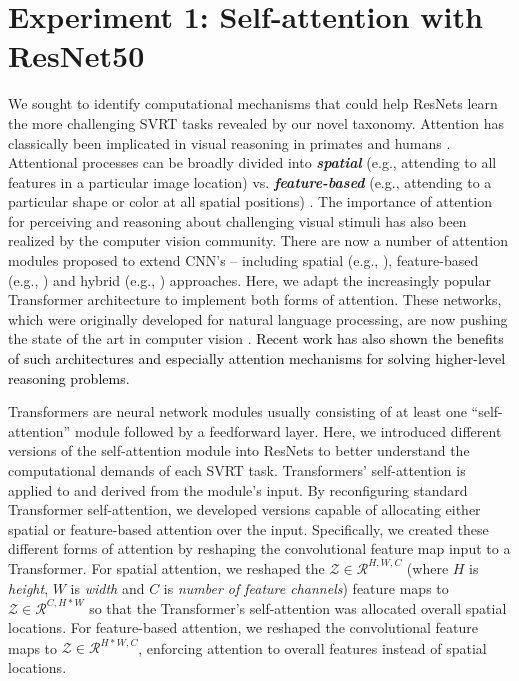 \section{Experiment 1: Self-attention with ResNet50}
\label{sec:exp2}
We sought to identify computational mechanisms that could help ResNets learn the more challenging SVRT tasks revealed by our novel taxonomy. Attention has classically been implicated in visual reasoning in primates and humans \citep{egly1994covert,roelfsema1998object}. Attentional processes can be broadly divided into \textit{\textbf{spatial}} (e.g., attending to all features in a particular image location) vs. \textit{\textbf{feature-based}} (e.g., attending to a particular shape or color at all spatial positions) \citep{desimone1995neural}. The importance of attention for perceiving and reasoning about challenging visual stimuli has also been realized by the computer vision community. There are now a number of attention modules proposed to extend CNN's -- including spatial  (e.g., \citet{Sharma2015-ow,journals/corr/ChenWCGXN15, yang2016, journals/corr/XuS15a,journals/corr/RenZ16}), feature-based (e.g., \citet{stollenga2014deep, chen2017sca, hu2018squeeze}) and hybrid (e.g., \citet{linsley2018global,woo2018cbam}) approaches. Here, we adapt the increasingly popular Transformer architecture \citep{vaswani2017attention} to implement both forms of attention. These networks, which were originally developed for natural language processing, are now pushing the state of the art in computer vision \citep{Zhu2020-nc,carion2020end,Dosovitskiy2020-iq}. \textcolor{black}{Recent work \citep{Ding2020AttentionOL} has also shown the benefits of such architectures and especially attention mechanisms for solving higher-level reasoning problems}.

Transformers are neural network modules usually consisting of at least one ``self-attention'' module followed by a feedforward layer. Here, we introduced different versions of the self-attention module into ResNets to better understand the computational demands of each SVRT task. Transformers' self-attention is applied to and derived from the module's input. By reconfiguring standard Transformer self-attention, we developed versions capable of allocating either spatial or feature-based attention over the input. Specifically, we created these different forms of attention by reshaping the convolutional feature map input to a Transformer. For spatial attention, we reshaped the $ \mathcal{Z} \in \mathcal{R}^{H, W, C}$ (where $H$ is \textit{height}, $W$ is \textit{width} and $C$ is \textit{number of feature channels}) feature maps to $ \mathcal{Z} \in \mathcal{R}^{C, H * W}$ so that the Transformer's self-attention was allocated overall spatial locations. For feature-based attention, we reshaped the convolutional feature maps to $\mathcal{Z} \in \mathcal{R}^{H * W, C}$, enforcing attention to overall features instead of spatial locations. 

